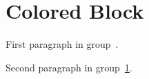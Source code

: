 \documentclass{article}
\begin{document}
\section{Colored Block}\label{sec:color}
{\color{blue}

First paragraph in group~\citep{k1}.

Second paragraph in group~\ref{sec:color}.
}


\end{document}

